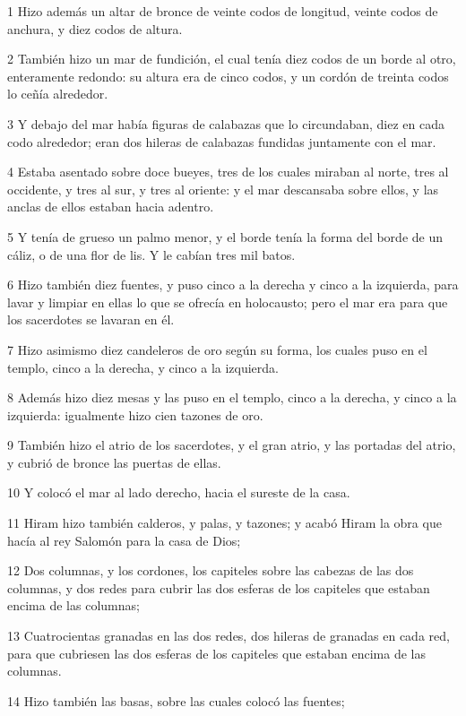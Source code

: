 \par 1 Hizo además un altar de bronce de veinte codos   de longitud, veinte codos de anchura, y diez codos de altura.
\par 2 También hizo un mar de fundición, el cual tenía diez codos   de un borde al otro, enteramente redondo: su altura era de cinco codos, y un cordón de treinta codos lo ceñía alrededor.
\par 3 Y debajo del mar había figuras de calabazas que lo circundaban, diez en cada codo    alrededor; eran dos hileras de calabazas fundidas juntamente con el mar.
\par 4 Estaba asentado sobre doce bueyes, tres de los cuales miraban al norte, tres al occidente, y tres al sur, y tres al oriente: y el mar descansaba sobre ellos, y las anclas de ellos estaban hacia adentro.
\par 5 Y tenía de grueso un palmo menor,  y el borde tenía la forma del borde de un cáliz, o de una flor de lis. Y le cabían tres mil batos.
\par 6 Hizo también diez fuentes, y puso cinco a la derecha y cinco a la izquierda, para lavar y limpiar en ellas lo que se ofrecía en holocausto; pero el mar era para que los sacerdotes se lavaran en él.
\par 7 Hizo asimismo diez candeleros de oro según su forma, los cuales puso en el templo, cinco a la derecha, y cinco a la izquierda.
\par 8 Además hizo diez mesas y las puso en el templo, cinco a la derecha, y cinco a la izquierda: igualmente hizo cien tazones de oro.
\par 9 También hizo el atrio de los sacerdotes, y el gran atrio, y las portadas del atrio, y cubrió de bronce las puertas de ellas.
\par 10 Y colocó el mar al lado derecho, hacia el sureste de la casa.
\par 11 Hiram hizo también calderos, y palas, y tazones; y acabó Hiram la obra que hacía al rey Salomón para la casa de Dios;
\par 12 Dos columnas, y los cordones, los capiteles sobre las cabezas de las dos columnas, y dos redes para cubrir las dos esferas de los capiteles que estaban encima de las columnas;
\par 13 Cuatrocientas granadas en las dos redes, dos hileras de granadas en cada red, para que cubriesen las dos esferas de los capiteles que estaban encima de las columnas.
\par 14 Hizo también las basas, sobre las cuales colocó las fuentes;
